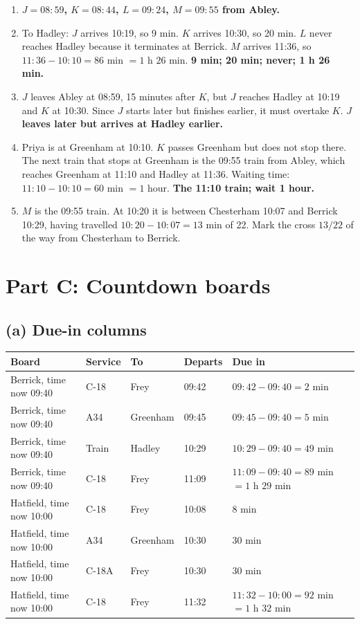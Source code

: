 \documentclass[11pt,a4paper]{article}
\newcommand{\ans}[1]{\textcolor{red!75!black}{\textbf{#1}}}
\begin{document}
\begin{enumerate}[label=\textbf{\alph*)},leftmargin=*]
\item \ans{\(J=08{:}59\), \(K=08{:}44\), \(L=09{:}24\), \(M=09{:}55\) from Abley.}
\item To Hadley: \(J\) arrives 10:19, so 9 min. \(K\) arrives 10:30, so 20 min. \(L\) never reaches Hadley because it terminates at Berrick. \(M\) arrives 11:36, so \(11{:}36-10{:}10=86\) min \(=1\) h \(26\) min. \ans{9 min; 20 min; never; 1 h 26 min.}
\item \(J\) leaves Abley at 08:59, 15 minutes after \(K\), but \(J\) reaches Hadley at 10:19 and \(K\) at 10:30. Since \(J\) starts later but finishes earlier, it must overtake \(K\). \ans{\(J\) leaves later but arrives at Hadley earlier.}
\item Priya is at Greenham at 10:10. \(K\) passes Greenham but does not stop there. The next train that stops at Greenham is the 09:55 train from Abley, which reaches Greenham at 11:10 and Hadley at 11:36. Waiting time: \(11{:}10-10{:}10=60\) min \(=1\) hour. \ans{The 11:10 train; wait 1 hour.}
\item \(M\) is the 09:55 train. At 10:20 it is between Chesterham 10:07 and Berrick 10:29, having travelled \(10{:}20-10{:}07=13\) min of 22. Mark the cross \(13/22\) of the way from Chesterham to Berrick.
\end{enumerate}

\section*{Part C: Countdown boards}

\subsection*{(a) Due-in columns}
\begin{tabularx}{\linewidth}{@{}l l l l X@{}}
\toprule
Board & Service & To & Departs & Due in\\
\midrule
Berrick, time now 09:40 & C-18 & Frey & 09:42 & \(09{:}42-09{:}40=2\) min\\
Berrick, time now 09:40 & A34 & Greenham & 09:45 & \(09{:}45-09{:}40=5\) min\\
Berrick, time now 09:40 & Train & Hadley & 10:29 & \(10{:}29-09{:}40=49\) min\\
Berrick, time now 09:40 & C-18 & Frey & 11:09 & \(11{:}09-09{:}40=89\) min \(=1\) h \(29\) min\\
\midrule
Hatfield, time now 10:00 & C-18 & Frey & 10:08 & 8 min\\
Hatfield, time now 10:00 & A34 & Greenham & 10:30 & 30 min\\
Hatfield, time now 10:00 & C-18A & Frey & 10:30 & 30 min\\
Hatfield, time now 10:00 & C-18 & Frey & 11:32 & \(11{:}32-10{:}00=92\) min \(=1\) h \(32\) min\\
\bottomrule
\end{tabularx}
\end{document}
